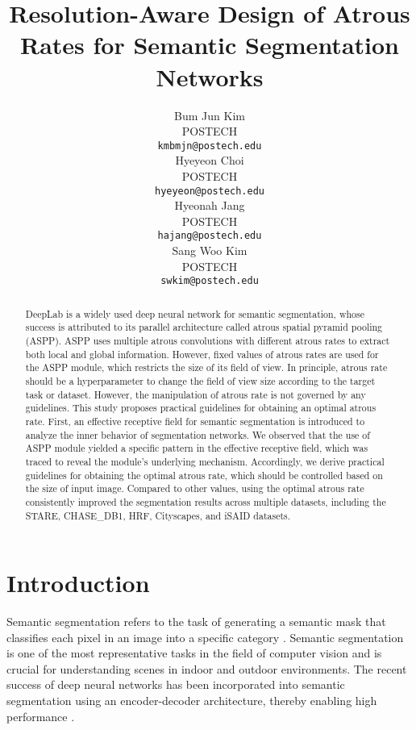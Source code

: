 \documentclass{article}
\title{Resolution-Aware Design of Atrous Rates for Semantic Segmentation Networks}
\author{Bum Jun Kim\\
    POSTECH\\
  \texttt{kmbmjn@postech.edu} \\
  \And
  Hyeyeon Choi\\
    POSTECH\\
  \texttt{hyeyeon@postech.edu} \\
  \And
    Hyeonah Jang\\
    POSTECH\\
  \texttt{hajang@postech.edu} \\
  \And
    Sang Woo Kim\\
    POSTECH\\
  \texttt{swkim@postech.edu} \\
}
\begin{document}
\maketitle


\begin{abstract}
	DeepLab is a widely used deep neural network for semantic segmentation, whose success is attributed to its parallel architecture called atrous spatial pyramid pooling (ASPP). ASPP uses multiple atrous convolutions with different atrous rates to extract both local and global information. However, fixed values of atrous rates are used for the ASPP module, which restricts the size of its field of view. In principle, atrous rate should be a hyperparameter to change the field of view size according to the target task or dataset. However, the manipulation of atrous rate is not governed by any guidelines. This study proposes practical guidelines for obtaining an optimal atrous rate. First, an effective receptive field for semantic segmentation is introduced to analyze the inner behavior of segmentation networks. We observed that the use of ASPP module yielded a specific pattern in the effective receptive field, which was traced to reveal the module's underlying mechanism. Accordingly, we derive practical guidelines for obtaining the optimal atrous rate, which should be controlled based on the size of input image. Compared to other values, using the optimal atrous rate consistently improved the segmentation results across multiple datasets, including the STARE, CHASE\_DB1, HRF, Cityscapes, and iSAID datasets.
\end{abstract}

\section{Introduction}
\label{sec:intro}
Semantic segmentation refers to the task of generating a semantic mask that classifies each pixel in an image into a specific category \citep{DBLP:journals/tog/AksoyOPPM18,DBLP:journals/tog/HuangFL14,DBLP:journals/tog/XiaoFZLQ09}. Semantic segmentation is one of the most representative tasks in the field of computer vision and is crucial for understanding scenes in indoor and outdoor environments. The recent success of deep neural networks has been incorporated into semantic segmentation using an encoder-decoder architecture, thereby enabling high performance \citep{DBLP:journals/tog/ZhuAFW21,DBLP:journals/tog/SchneiderT16}.
\end{document}
